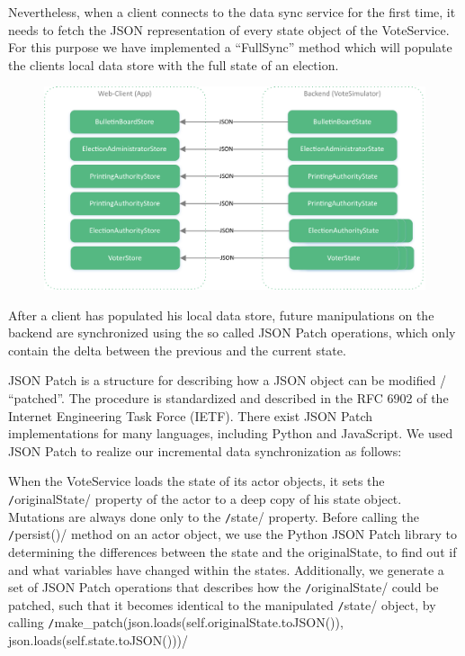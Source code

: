 Nevertheless, when a client connects to the data sync service for the first time, it needs to fetch the JSON representation of every state object of the VoteService. For this purpose we have implemented a "`FullSync"' method which will populate the clients local data store with the full state of an election.

\begin{figure}
\begin{center}
\includegraphics[scale=0.62]{assets/datastores.pdf}
\label{Datastores}%
\end{center}
\end{figure}
After a client has populated his local data store, future manipulations on the backend are synchronized using the so called JSON Patch operations, which only contain the delta between the previous and the current state.

JSON Patch is a structure for describing how a JSON object can be modified / "`patched"'. The procedure is standardized and described in the RFC 6902 of the Internet Engineering Task Force (IETF). There exist JSON Patch implementations for many languages, including Python and JavaScript. We used JSON Patch to realize our incremental data synchronization as follows:

When the VoteService loads the state of its actor objects, it sets the \texttt/originalState/ property of the actor to a deep copy of his state object. Mutations are always done only to the \texttt/state/ property. Before calling the \texttt/persist()/ method on an actor object, we use the Python JSON Patch library to determining the differences between the state and the originalState, to find out if and what variables have changed within the states. Additionally, we generate a set of JSON Patch operations that describes how the \texttt/originalState/ could be patched, such that it becomes identical to the manipulated \texttt/state/ object, by calling \texttt/make_patch(json.loads(self.originalState.toJSON()), json.loads(self.state.toJSON()))/

